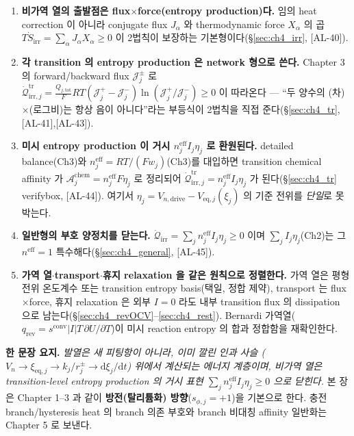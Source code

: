 \documentclass[11pt,a4paper]{article}
\newcommand{\dd}{\mathrm{d}}
\newcommand{\eff}{\mathrm{eff}}
\newcommand{\eq}{\mathrm{eq}}
\newcommand{\drive}{\mathrm{drive}}
\newcommand{\tot}{\mathrm{tot}}
\newcommand{\irr}{\mathrm{irr}}
\newcommand{\rev}{\mathrm{rev}}
\newcommand{\conv}{\mathrm{conv}}
\newcommand{\tr}{\mathrm{tr}}
\newcommand{\chem}{\mathrm{chem}}
\newcommand{\AL}[1]{\textsf{[AL-#1]}}
\begin{document}
\begin{enumerate}[label=\textbf{(\arabic*)},leftmargin=2.2em]
\item \textbf{비가역 열의 출발점은 flux$\times$force(entropy production)다.} 임의 heat correction 이 아니라
  conjugate flux $J_\alpha$ 와 thermodynamic force $X_\alpha$ 의 곱 $T\dot S_\irr=\sum_\alpha J_\alpha X_\alpha\ge0$
  이 2법칙이 보장하는 기본형이다(\S\ref{sec:ch4_irr}, \AL{40}).
\item \textbf{각 transition 의 entropy production 은 network 형으로 쓴다.} Chapter 3 의 forward/backward
  flux $\mathcal J_j^\pm$ 로 $\dot{\mathcal Q}_{\irr,j}^{\tr}=\tfrac{Q_{j,\tot}}{F}RT(\mathcal J_j^+-\mathcal J_j^-)
  \ln(\mathcal J_j^+/\mathcal J_j^-)\ge0$ 이 따라온다 — ``두 양수의 (차)$\times$(로그비)는 항상 음이 아니다''라는
  부등식이 2법칙을 직접 준다(\S\ref{sec:ch4_tr}, \AL{41},\AL{43}).
\item \textbf{미시 entropy production 이 거시 $n_j^{\eff}I_j\eta_j$ 로 환원된다.} detailed balance(Ch3)와
  $n_j^{\eff}=RT/(Fw_j)$(Ch3)를 대입하면 transition chemical affinity 가 $\mathcal A_j^{\chem}=n_j^{\eff}F\eta_j$
  로 정리되어 $\dot{\mathcal Q}_{\irr,j}^{\tr}=n_j^{\eff}I_j\eta_j$ 가 된다(\S\ref{sec:ch4_tr} verifybox,
  \AL{44}). 여기서 $\eta_j=V_{n,\drive}-V_{\eq,j}(\xi_j)$ 의 기준 전위를 \emph{단일}로 못박는다.
\item \textbf{일반형의 부호 양정치를 닫는다.} $\dot{\mathcal Q}_\irr=\sum_j n_j^{\eff}I_j\eta_j\ge0$ 이며
  $\sum_j I_j\eta_j$(Ch2)는 그 $n^{\eff}=1$ 특수해다(\S\ref{sec:ch4_general}, \AL{45}).
\item \textbf{가역 열$\cdot$transport$\cdot$휴지 relaxation 을 같은 원칙으로 정렬한다.} 가역 열은 평형 전위
  온도계수 또는 transition entropy basis(택일, 정합 제약), transport 는 flux$\times$force, 휴지 relaxation 은
  외부 $I=0$ 라도 내부 transition flux 의 dissipation 으로 남는다(\S\ref{sec:ch4_revOCV}--\ref{sec:ch4_rest}).
  Bernardi 가역열($q_\rev=s^\conv|I|T\,\partial U/\partial T$)이 미시 reaction entropy 의 합과 정합함을
  재확인한다.
\end{enumerate}

\noindent\textbf{한 문장 요지.} \emph{발열은 새 피팅항이 아니라, 이미 깔린 인과 사슬
($V_n\to\xi_{\eq,j}\to k_j/r_j^\pm\to\dd\xi_j/\dd t$) 위에서 계산되는 에너지 계층이며, 비가역 열은
transition-level entropy production 의 거시 표현 $\sum_j n_j^{\eff}I_j\eta_j\ge0$ 으로 닫힌다.} 본 장은
Chapter 1--3 과 같이 \textbf{방전(탈리튬화) 방향}($s_{\phi,j}=+1$)을 기본으로 한다. 충전 branch/hysteresis
heat 의 branch 의존 부호와 branch 비대칭 affinity 일반화는 Chapter 5 로 보낸다.
\end{document}
